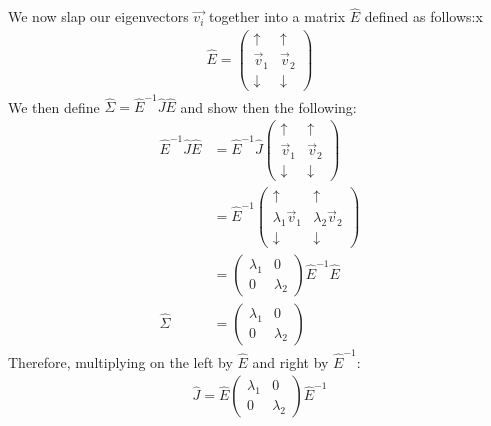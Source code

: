 We now slap our eigenvectors $\vec{v_i}$ together into a matrix $\hat{E}$ defined as follows:x
\begin{align*}
    \hat{E} = \left( 
        \begin{array}{cc}
            \uparrow & \uparrow \\
            \vec{v}_1 & \vec{v}_2 \\
            \downarrow & \downarrow
        \end{array}
    \right)
\end{align*}
We then define $\hat{\Sigma}=\hat{E}^{-1}\hat{J}\hat{E}$ and show then the following:
\begin{align*}
    \hat{E}^{-1}\hat{J}\hat{E} &= \hat{E}^{-1}\hat{J}\left( 
        \begin{array}{cc}
            \uparrow & \uparrow \\
            \vec{v}_1 & \vec{v}_2 \\
            \downarrow & \downarrow
        \end{array}
    \right)\\
    &=\hat{E}^{-1}\left( 
        \begin{array}{cc}
            \uparrow & \uparrow \\
            \lambda_1\vec{v}_1 & \lambda_2\vec{v}_2 \\
            \downarrow & \downarrow
        \end{array}
    \right)\\
    &=\left( 
        \begin{array}{cc}
            \lambda_1 & 0 \\
            0 & \lambda_2
        \end{array}
    \right)
    \hat{E}^{-1}\hat{E}\\
    \hat{\Sigma}&=\left( 
        \begin{array}{cc}
            \lambda_1 & 0 \\
            0 & \lambda_2
        \end{array}
    \right)
\end{align*}
Therefore, multiplying on the left by $\hat{E}$ and right by $\hat{E}^{-1}$:
\begin{align*}
    \hat{J}=\hat{E}\left( 
        \begin{array}{cc}
            \lambda_1 & 0 \\
            0 & \lambda_2
        \end{array}
    \right)\hat{E}^{-1}
\end{align*}
